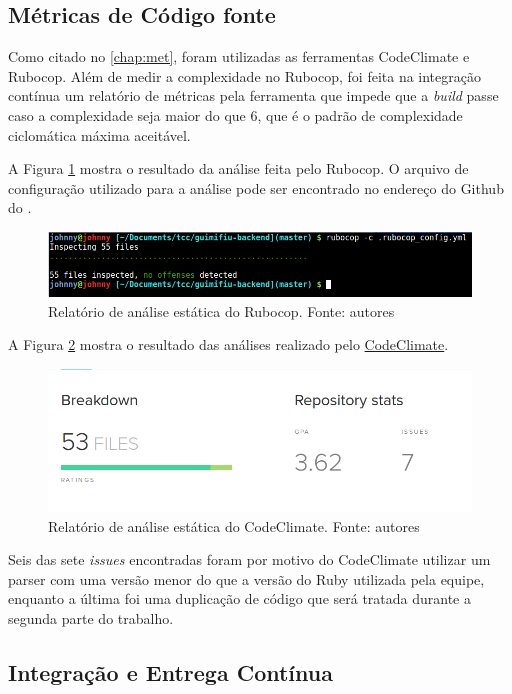 \subsection{Métricas de Código fonte}

Como citado no \autoref{chap:met}, foram utilizadas as ferramentas CodeClimate e Rubocop. Além de medir a complexidade no Rubocop, foi feita na integração contínua um relatório de métricas pela ferramenta que impede que a \textit{build} passe caso a complexidade seja maior do que 6, que é o padrão de complexidade ciclomática máxima aceitável.

A Figura \ref{img:rubocop} mostra o resultado da análise feita pelo Rubocop. O arquivo de configuração utilizado para a análise pode ser encontrado no endereço do Github do  .

\begin{figure}[H]
    \centering
    \includegraphics[scale=0.5]{figuras/rubocop.png}
    \caption[Relatório de análise estática do Rubocop]{Relatório de análise estática do Rubocop. Fonte: autores}
    \label{img:rubocop}
\end{figure}

A Figura \ref{img:codeclimate} mostra o resultado das análises realizado pelo \href{https://codeclimate.com/github/Guimifiu/guimifiu-backend/}{CodeClimate}.

\begin{figure}[H]
    \centering
    \includegraphics[scale=0.5]{figuras/codeclimate.png}
    \caption[Relatório de análise estática do CodeClimate]{Relatório de análise estática do CodeClimate. Fonte: autores}
    \label{img:codeclimate}
\end{figure}

Seis das sete \textit{issues} encontradas foram por motivo do CodeClimate utilizar um parser com uma versão menor do que a versão do Ruby utilizada pela equipe, enquanto a última foi uma duplicação de código que será tratada durante a segunda parte do trabalho.


\subsection{Integração e Entrega Contínua}

